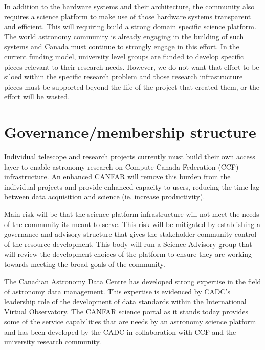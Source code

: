 \documentclass[11pt]{article}
\begin{document}
In addition to the hardware systems and their architecture, the community also requires a science platform to make use of those hardware systems transparent and efficient.   This will requiring build a strong domain specific science platform.  The world astronomy community is already engaging in the building of such systems and Canada must continue to strongly engage in this effort.  In the current funding model,  university level groups are funded to develop specific pieces relevant to their research needs.  However, we do not want that effort to be siloed within the specific research problem and those research infrastructure pieces must be supported beyond the life of the project that created them, or the effort will be wasted.

 
\section{Governance/membership structure}




\begin{lrptextbox}
Individual telescope and research projects currently must build their own access layer to enable astronomy research on Compute Canada Federation (CCF) infrastructure.  An enhanced CANFAR will remove this burden from the individual projects and provide enhanced capacity to users, reducing the time lag between data acquisition and science (ie. increase productivity).
\end{lrptextbox}

\begin{lrptextbox}
Main risk will be that the science platform infrastructure will not meet the needs of the community its meant to serve.  This risk will be mitigated by establishing a governance and advisory structure that gives the stakeholder community control of the resource development.  This body will run a Science Advisory group that will review the development choices of the platform to ensure they are working towards meeting the broad goals of the community.  
\end{lrptextbox}

\begin{lrptextbox} 
The Canadian Astronomy Data Centre has developed strong expertise in the field of  astronomy data management. This expertise is evidenced by CADC's leadership role of the development of data standards within the International Virtual Observatory.  The CANFAR science portal as it stands today provides some of the service capabilities that are needs by an astronomy science platform and has been developed by the CADC in collaboration with CCF and the university research community. 
\end{lrptextbox}
\end{document}
